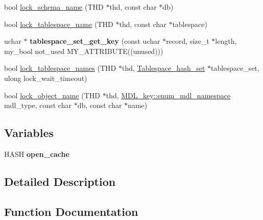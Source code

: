 \begin{DoxyCompactItemize}
\item 
bool \mbox{\hyperlink{group__Locking_gac67865dd0ef1b003fdee2182aba9a049}{lock\+\_\+schema\+\_\+name}} (T\+HD $\ast$thd, const char $\ast$db)
\item 
bool \mbox{\hyperlink{group__Locking_ga1923c93a226a0a762e9a7675135f770e}{lock\+\_\+tablespace\+\_\+name}} (T\+HD $\ast$thd, const char $\ast$tablespace)
\item 
\mbox{\label{group__Locking_ga53e5914955b0e1ad76551983a22ecf60}} 
uchar $\ast$ {\bfseries tablespace\+\_\+set\+\_\+get\+\_\+key} (const uchar $\ast$record, size\+\_\+t $\ast$length, my\+\_\+bool not\+\_\+used M\+Y\+\_\+\+A\+T\+T\+R\+I\+B\+U\+TE((unused)))
\item 
bool \mbox{\hyperlink{group__Locking_ga377fe3850ef2fce0988a3cffb9128159}{lock\+\_\+tablespace\+\_\+names}} (T\+HD $\ast$thd, \mbox{\hyperlink{classHash__set}{Tablespace\+\_\+hash\+\_\+set}} $\ast$tablespace\+\_\+set, ulong lock\+\_\+wait\+\_\+timeout)
\item 
bool \mbox{\hyperlink{group__Locking_gab03d9cc9ff9682e9f2a961685fd90cb3}{lock\+\_\+object\+\_\+name}} (T\+HD $\ast$thd, \mbox{\hyperlink{structMDL__key_a391ec4bd98fec6852a48f7856546ed3b}{M\+D\+L\+\_\+key\+::enum\+\_\+mdl\+\_\+namespace}} mdl\+\_\+type, const char $\ast$db, const char $\ast$name)
\end{DoxyCompactItemize}
\subsection*{Variables}
\begin{DoxyCompactItemize}
\item 
\mbox{\label{group__Locking_gadb186a1125c10d63d0217bc321a4c95a}} 
H\+A\+SH {\bfseries open\+\_\+cache}
\end{DoxyCompactItemize}


\subsection{Detailed Description}


\subsection{Function Documentation}
\mbox{\label{group__Locking_gab03d9cc9ff9682e9f2a961685fd90cb3}} 
